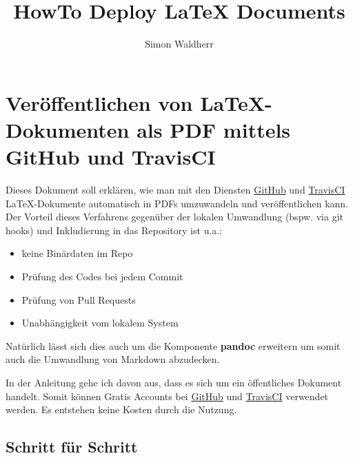 \documentclass[10pt,a4paper]{article}
\date{}
\title{HowTo Deploy LaTeX Documents}
\author{Simon Waldherr}
\providecommand{\tightlist}{
  \setlength{\itemsep}{0pt}\setlength{\parskip}{0pt}}
\begin{document}
\section{Veröffentlichen von \LaTeX -Dokumenten als PDF mittels GitHub und
TravisCI}\label{veruxf6ffentlichen-von-latex-dokumenten-als-pdf-mittels-github-und-travisci}

Dieses Dokument soll erklären, wie man mit den Diensten
\href{https://github.com/}{GitHub} und
\href{https://travis-ci.org/}{TravisCI} \LaTeX -Dokumente automatisch in
PDFs umzuwandeln und veröffentlichen kann. Der Vorteil dieses Verfahrens
gegenüber der lokalen Umwandlung (bspw. via git hooks) und Inkludierung
in das Repository ist u.a.:

\begin{itemize}
\tightlist
\item
  keine Binärdaten im Repo
\item
  Prüfung des Codes bei jedem Commit
\item
  Prüfung von Pull Requests
\item
  Unabhängigkeit vom lokalem System
\end{itemize}

Natürlich lässt sich dies auch um die Komponente \textbf{pandoc}
erweitern um somit auch die Umwandlung von Markdown abzudecken.

In der Anleitung gehe ich davon aus, dass es sich um ein öffentliches
Dokument handelt. Somit können Gratis Accounts bei
\href{https://github.com/}{GitHub} und
\href{https://travis-ci.org/}{TravisCI} verwendet werden. Es entstehen
keine Kosten durch die Nutzung.

\subsection{Schritt für Schritt}\label{schritt-fuxfcr-schritt}
\end{document}
